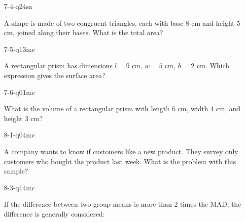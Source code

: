 \begin{practiceQuestion}{7-4-q24}{sa}
\begin{questionText}
A shape is made of two congruent triangles, each with base $8$ cm and height $5$ cm, joined along their bases. What is the total area?
\end{questionText}
\end{practiceQuestion}

\begin{practiceQuestion}{7-5-q13}{mc}
\begin{questionText}
A rectangular prism has dimensions $l = 9$ cm, $w = 5$ cm, $h = 2$ cm. Which expression gives the surface area?
\end{questionText}
\end{practiceQuestion}

\begin{practiceQuestion}{7-6-q01}{mc}
\begin{questionText}
What is the volume of a rectangular prism with length $6$ cm, width $4$ cm, and height $3$ cm?
\end{questionText}
\end{practiceQuestion}

\begin{practiceQuestion}{8-1-q04}{mc}
\begin{questionText}
A company wants to know if customers like a new product. They survey only customers who bought the product last week. What is the problem with this sample?
\end{questionText}
\end{practiceQuestion}

\begin{practiceQuestion}{8-3-q14}{mc}
\begin{questionText}
If the difference between two group means is more than $2$ times the MAD, the difference is generally considered:
\end{questionText}
\end{practiceQuestion}

